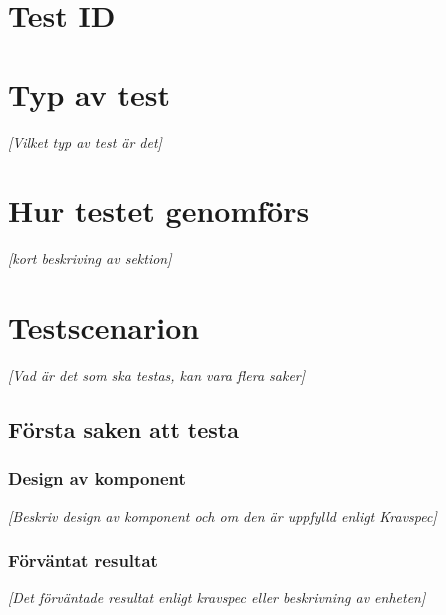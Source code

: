 \documentclass[a4paper,10pt]{article}
\begin{document}
\section{Test ID}
\section{Typ av test}
\emph{[Vilket typ av test är det]}
\section{Hur testet genomförs}
\emph{[kort beskriving av sektion]}
\section{Testscenarion}
\emph{[Vad är det som ska testas, kan vara flera saker]}
\subsection{Första saken att testa}
\subsubsection{Design av komponent}
\emph{[Beskriv design av komponent och om den är uppfylld enligt Kravspec]}
\subsubsection{Förväntat resultat}
\emph{[Det förväntade resultat enligt kravspec eller beskrivning av enheten]}
\end{document}
